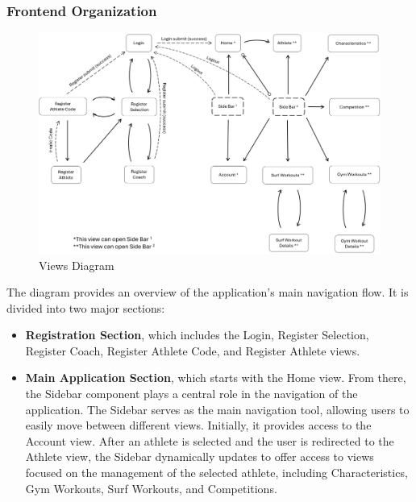 \documentclass[a4paper,twoside,11pt]{article}
\begin{document}
\subsubsection{Frontend Organization}

\begin{figure}[H]
\centering
\includegraphics[width=6in]{ViewsDiagram.png}
\caption{Views Diagram}
\end{figure}

The diagram provides an overview of the application's main navigation flow.  
It is divided into two major sections:

\begin{itemize}
\item \textbf{Registration Section}, which includes the Login, Register Selection, Register Coach, Register Athlete Code, and Register Athlete views.
  
\item \textbf{Main Application Section}, which starts with the Home view. From there, the Sidebar component plays a central role in the navigation of the application.  
The Sidebar serves as the main navigation tool, allowing users to easily move between different views.  
Initially, it provides access to the Account view. After an athlete is selected and the user is redirected to the Athlete view, the Sidebar dynamically updates to offer access to views focused on the management of the selected athlete, including Characteristics, Gym Workouts, Surf Workouts, and Competitions.
\end{itemize}
\end{document}
